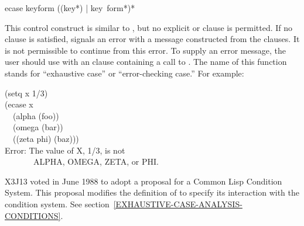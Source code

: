 \begin{defmac}
ecase keyform {({({key}*) | key} {\,form}*)}*

\begin{obsolete}\noindent
This control construct is similar to ,
but no explicit  or  clause is permitted.
If no clause is satisfied,  signals an error with a
message constructed from the clauses.  It is not permissible to continue
from this error.  To supply an error message, the user should use
 with an  clause containing a call to .
The name of this function stands for ``exhaustive case'' or
``error-checking case.'' 
For example:
\begin{lisp}
(setq x 1/3)	 \\
(ecase x \\
~~(alpha (foo)) \\
~~(omega (bar)) \\
~~((zeta phi) (baz))) \\
Error: The value of X, 1/3, is not \\
~~~~~~~ALPHA, OMEGA, ZETA, or PHI.
\end{lisp}
\end{obsolete}

\begin{new}
X3J13 voted in June 1988
to adopt a proposal for a Common Lisp Condition System. 
This proposal modifies the definition of  to specify its
interaction with the condition system.
See section~\ref{EXHAUSTIVE-CASE-ANALYSIS-CONDITIONS}.
\end{new}
\end{defmac}

